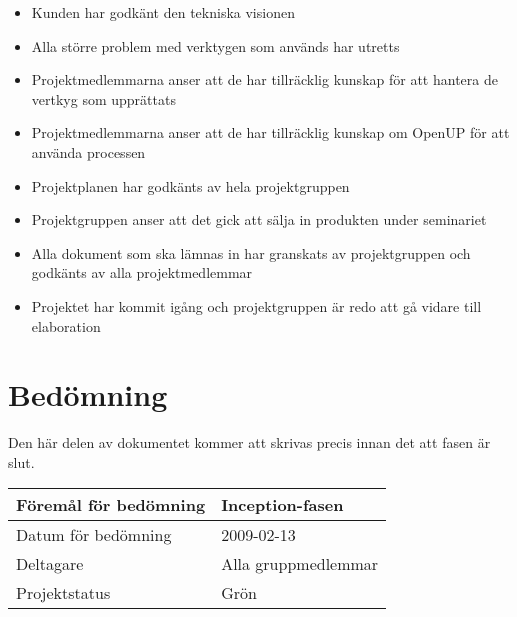 \begin{itemize}
	\item Kunden har godkänt den tekniska visionen
	\item Alla större problem med verktygen som används har utretts
	\item Projektmedlemmarna anser att de har tillräcklig kunskap för att hantera de vertkyg som upprättats
	\item Projektmedlemmarna anser att de har tillräcklig kunskap om OpenUP för att använda processen
	\item Projektplanen har godkänts av hela projektgruppen
	\item Projektgruppen anser att det gick att sälja in produkten under seminariet
	\item Alla dokument som ska lämnas in har granskats av projektgruppen och godkänts av alla projektmedlemmar
	\item Projektet har kommit igång och projektgruppen är redo att gå vidare till elaboration
\end{itemize}

\section{Bedömning}
Den här delen av dokumentet kommer att skrivas precis innan det att fasen är slut.

\begin{center}
	\begin{tabular}{| l | l |}
		\hline Föremål för bedömning & Inception-fasen \\
		\hline Datum för bedömning & 2009-02-13 \\
		\hline Deltagare & Alla gruppmedlemmar \\
		\hline Projektstatus & Grön \\
		\hline
	\end{tabular}
\end{center}

